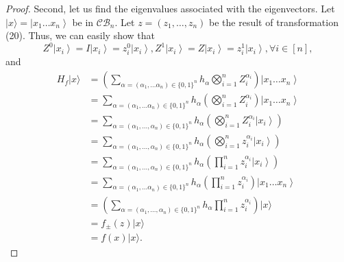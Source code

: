 \begin{proof}
    Second, let us find the eigenvalues associated with the eigenvectors. Let $|x\rangle=\left|x_{1} \ldots x_{n}\right\rangle$ be in $\mathcal{C B}_{n}$. Let $z=\left(z_{1}, \ldots, z_{n}\right)$ be the result of transformation (20). Thus, we can easily show that 
\begin{equation}
    Z^{0}\left|x_{i}\right\rangle=I\left|x_{i}\right\rangle=z_{i}^{0}\left|x_{i}\right\rangle,Z^{1}\left|x_{i}\right\rangle=Z\left|x_{i}\right\rangle=z_{i}^{1}\left|x_{i}\right\rangle, \forall i \in[n],
\end{equation}
and
\begin{equation}
\begin{aligned}
H_{f}|x\rangle 
& =\left(\sum_{\alpha=\left(\alpha_{1}, \ldots \alpha_{n}\right) \in\{0,1\}^{n}} h_{\alpha} \bigotimes_{i=1}^{n} Z_{i}^{\alpha_{i}}\right) \left|x_{1} \ldots x_{n}\right\rangle\\
& =\sum_{\alpha=\left(\alpha_{1}, \ldots \alpha_{n}\right) \in\{0,1\}^{n}} h_{\alpha} \left(\bigotimes_{i=1}^{n} Z_{i}^{\alpha_{i}}\right) \left|x_{1} \ldots x_{n}\right\rangle\\
& =\sum_{\alpha=\left(\alpha_{1}, \ldots, \alpha_{n}\right) \in\{0,1\}^{n}} h_{\alpha} \left( \bigotimes_{i=1}^{n} Z_{i}^{\alpha_{i}}\left|x_{i}\right\rangle\right) \\
& =\sum_{\alpha=\left(\alpha_{1}, \ldots, \alpha_{n}\right) \in\{0,1\}^{n}} h_{\alpha} \left(\bigotimes_{i=1}^{n} z_{i}^{\alpha_{i}}\left|x_{i}\right\rangle\right) \\
& =\sum_{\alpha=\left(\alpha_{1}, \ldots, \alpha_{n}\right) \in\{0,1\}^{n}} h_{\alpha} \left(\prod_{i=1}^{n} z_{i}^{\alpha_{i}}\left|x_{i}\right\rangle\right) \\
& =\sum_{\alpha=\left(\alpha_{1}, \ldots \alpha_{n}\right) \in\{0,1\}^{n}} h_{\alpha} \left(\prod_{i=1}^{n} z_{i}^{\alpha_{i}}\right) \left|x_{1} \ldots x_{n}\right\rangle\\
& =\left(\sum_{\alpha=\left(\alpha_{1}, \ldots, \alpha_{n}\right) \in\{0,1\}^{n}} h_{\alpha} \prod_{i=1}^{n} z_{i}^{\alpha_{i}}\right)|x\rangle \\
& =f_{ \pm}(z)|x\rangle \\
& =f(x)|x\rangle .
\end{aligned}
\end{equation}
\end{proof}

